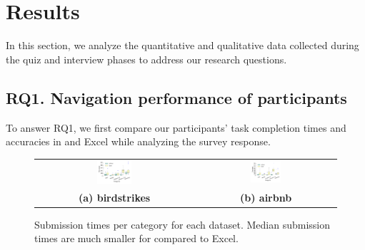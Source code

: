 \section{Results}
\label{sec:results}
In this section, we analyze the quantitative and 
qualitative data collected during the quiz and interview phases 
to address our research questions. 

\subsection{RQ1. Navigation performance of participants}
\label{sec:rq1}
To answer RQ1, we first compare our participants’ task completion times  
and accuracies in \noah and Excel while analyzing the survey response.  
\begin{figure}[t]
   \centering
\begin{tabular}{c c}  %
 \includegraphics[width=0.23\textwidth,trim={18 37 20 15},clip]{images/bird_box.pdf} &
   \includegraphics[width=0.23\textwidth,trim={18 37 20 15},clip]{images/airbnb_box.pdf} \\
   \textbf{(a) birdstrikes} & \textbf{(b) airbnb} \\
\end{tabular}
\caption{Submission times per category for each dataset. Median submission times are much smaller for \noah compared to Excel.}
\label{fig:timeBox}
\end{figure}

